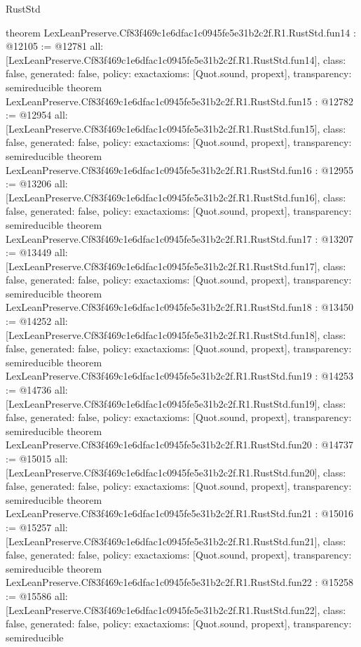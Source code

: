 \begin{lexlean}{RustStd}
\begin{coremodule}
{}
theorem LexLeanPreserve.Cf83f469c1e6dfac1c0945fe5e31b2c2f.R1.RustStd.fun14 : @12105 := @12781 {
  all: [LexLeanPreserve.Cf83f469c1e6dfac1c0945fe5e31b2c2f.R1.RustStd.fun14],
  class: false,
  generated: false,
  policy: exact{axioms: [Quot.sound, propext]},
  transparency: semireducible
}
theorem LexLeanPreserve.Cf83f469c1e6dfac1c0945fe5e31b2c2f.R1.RustStd.fun15 : @12782 := @12954 {
  all: [LexLeanPreserve.Cf83f469c1e6dfac1c0945fe5e31b2c2f.R1.RustStd.fun15],
  class: false,
  generated: false,
  policy: exact{axioms: [Quot.sound, propext]},
  transparency: semireducible
}
theorem LexLeanPreserve.Cf83f469c1e6dfac1c0945fe5e31b2c2f.R1.RustStd.fun16 : @12955 := @13206 {
  all: [LexLeanPreserve.Cf83f469c1e6dfac1c0945fe5e31b2c2f.R1.RustStd.fun16],
  class: false,
  generated: false,
  policy: exact{axioms: [Quot.sound, propext]},
  transparency: semireducible
}
theorem LexLeanPreserve.Cf83f469c1e6dfac1c0945fe5e31b2c2f.R1.RustStd.fun17 : @13207 := @13449 {
  all: [LexLeanPreserve.Cf83f469c1e6dfac1c0945fe5e31b2c2f.R1.RustStd.fun17],
  class: false,
  generated: false,
  policy: exact{axioms: [Quot.sound, propext]},
  transparency: semireducible
}
theorem LexLeanPreserve.Cf83f469c1e6dfac1c0945fe5e31b2c2f.R1.RustStd.fun18 : @13450 := @14252 {
  all: [LexLeanPreserve.Cf83f469c1e6dfac1c0945fe5e31b2c2f.R1.RustStd.fun18],
  class: false,
  generated: false,
  policy: exact{axioms: [Quot.sound, propext]},
  transparency: semireducible
}
theorem LexLeanPreserve.Cf83f469c1e6dfac1c0945fe5e31b2c2f.R1.RustStd.fun19 : @14253 := @14736 {
  all: [LexLeanPreserve.Cf83f469c1e6dfac1c0945fe5e31b2c2f.R1.RustStd.fun19],
  class: false,
  generated: false,
  policy: exact{axioms: [Quot.sound, propext]},
  transparency: semireducible
}
theorem LexLeanPreserve.Cf83f469c1e6dfac1c0945fe5e31b2c2f.R1.RustStd.fun20 : @14737 := @15015 {
  all: [LexLeanPreserve.Cf83f469c1e6dfac1c0945fe5e31b2c2f.R1.RustStd.fun20],
  class: false,
  generated: false,
  policy: exact{axioms: [Quot.sound, propext]},
  transparency: semireducible
}
theorem LexLeanPreserve.Cf83f469c1e6dfac1c0945fe5e31b2c2f.R1.RustStd.fun21 : @15016 := @15257 {
  all: [LexLeanPreserve.Cf83f469c1e6dfac1c0945fe5e31b2c2f.R1.RustStd.fun21],
  class: false,
  generated: false,
  policy: exact{axioms: [Quot.sound, propext]},
  transparency: semireducible
}
theorem LexLeanPreserve.Cf83f469c1e6dfac1c0945fe5e31b2c2f.R1.RustStd.fun22 : @15258 := @15586 {
  all: [LexLeanPreserve.Cf83f469c1e6dfac1c0945fe5e31b2c2f.R1.RustStd.fun22],
  class: false,
  generated: false,
  policy: exact{axioms: [Quot.sound, propext]},
  transparency: semireducible
}
\end{coremodule}
\end{lexlean}
